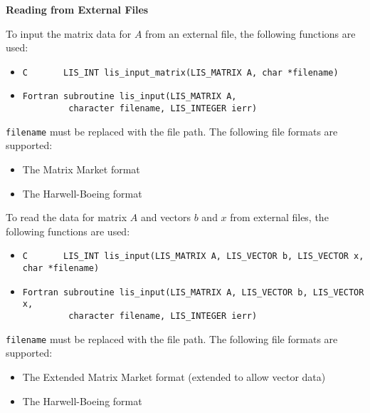 \documentclass[a4paper]{article}
\begin{document}
\noindent
{\bf Reading from External Files}

To input the matrix data for $A$ from an external file,
the following functions are used:
\begin{itemize}
\item \verb|C       LIS_INT lis_input_matrix(LIS_MATRIX A, char *filename)|
\item \verb|Fortran subroutine lis_input(LIS_MATRIX A,|\\
      \verb|         character filename, LIS_INTEGER ierr)|
\end{itemize}
{\tt filename} must be replaced with the file path.
The following file formats are supported:

\begin{itemize}
\item The Matrix Market format
\item The Harwell-Boeing format
\end{itemize}

To read the data for matrix $A$ and vectors $b$ and $x$ from
external files, the following functions are used:
\begin{itemize}
\item \verb|C       LIS_INT lis_input(LIS_MATRIX A, LIS_VECTOR b, LIS_VECTOR x, char *filename)|
\item \verb|Fortran subroutine lis_input(LIS_MATRIX A, LIS_VECTOR b, LIS_VECTOR x,|\\
      \verb|         character filename, LIS_INTEGER ierr)|
\end{itemize}
{\tt filename} must be replaced with the file path.
The following file formats are supported:

\begin{itemize}
\item The Extended Matrix Market format (extended to allow vector data)
\item The Harwell-Boeing format
\end{itemize}
\end{document}
